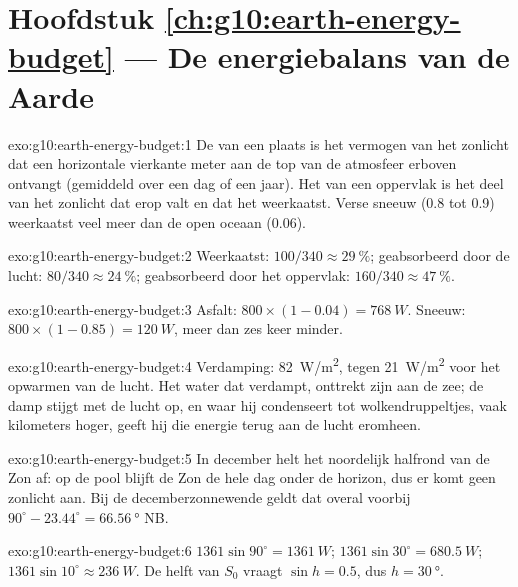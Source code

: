 \section*{Hoofdstuk \ref{ch:g10:earth-energy-budget} --- De energiebalans van de Aarde}

\begin{solution}{exo:g10:earth-energy-budget:1}
De  van een plaats is het vermogen van het zonlicht dat een
horizontale vierkante meter aan de top van de atmosfeer erboven ontvangt
(gemiddeld over een dag of een jaar). Het  van een oppervlak is het deel
van het zonlicht dat erop valt en dat het weerkaatst. Verse sneeuw (0.8 tot 0.9)
weerkaatst veel meer dan de open oceaan (0.06).
\end{solution}

\begin{solution}{exo:g10:earth-energy-budget:2}
Weerkaatst: $100/340 \approx \qty{29}{\percent}$; geabsorbeerd door de lucht:
$80/340 \approx \qty{24}{\percent}$; geabsorbeerd door het oppervlak: $160/340
\approx \qty{47}{\percent}$.
\end{solution}

\begin{solution}{exo:g10:earth-energy-budget:3}
Asfalt: $800 \times (1 - 0.04) = \qty{768}{W}$. Sneeuw: $800 \times (1 -
0.85) = \qty{120}{W}$, meer dan zes keer minder.
\end{solution}

\begin{solution}{exo:g10:earth-energy-budget:4}
Verdamping: \qty{82}{W/m^2}, tegen \qty{21}{W/m^2} voor het opwarmen van de
lucht. Het water dat verdampt, onttrekt zijn  aan de zee; de damp
stijgt met de lucht op, en waar hij condenseert tot wolkendruppeltjes, vaak
kilometers hoger, geeft hij die energie terug aan de lucht eromheen.
\end{solution}

\begin{solution}{exo:g10:earth-energy-budget:5}
In december helt het noordelijk halfrond van de Zon af: op de pool blijft de
Zon de hele dag onder de horizon, dus er komt geen zonlicht aan. Bij de
decemberzonnewende geldt dat overal voorbij $90^\circ - 23.44^\circ =
\qty{66.56}{\degree}$ NB.
\end{solution}

\begin{solution}{exo:g10:earth-energy-budget:6}
$1361 \sin 90^\circ = \qty{1361}{W}$; $1361 \sin 30^\circ =
\qty{680.5}{W}$; $1361 \sin 10^\circ \approx \qty{236}{W}$. De helft van $S_0$
vraagt $\sin h = 0.5$, dus $h = \qty{30}{\degree}$.
\end{solution}

